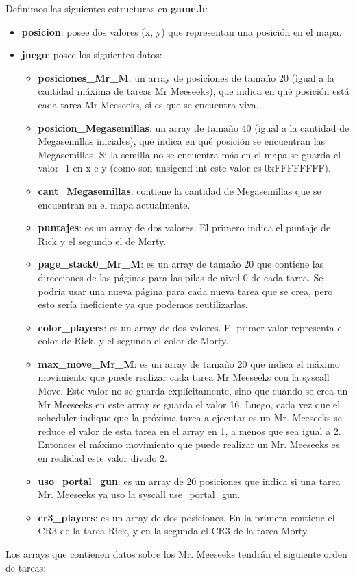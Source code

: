 \documentclass[a4paper]{article}
\begin{document}
\justify
Definimos las siguientes estructuras en \textbf{game.h}:
\begin{itemize}
	\item \textbf{posicion}: posee dos valores (x, y) que representan una posición en el mapa.
	\item \textbf{juego}: posee los siguientes datos:
	\begin{itemize}
		\item \textbf{posiciones_Mr_M}: un array de posiciones de tamaño 20 (igual a la cantidad máxima de tareas Mr Meeseeks), que indica en qué posición está cada tarea Mr Meeseeks, si es que se encuentra viva.
		\item \textbf{posicion_Megasemillas}: un array de tamaño 40 (igual a la cantidad de Megasemillas iniciales), que indica en qué posición se encuentran las Megasemillas. Si la semilla no se encuentra más en el mapa se guarda el valor -1 en x e y (como son unsigend int este valor es 0xFFFFFFFF).
		\item \textbf{cant_Megasemillas}: contiene la cantidad de Megasemillas que se encuentran en el mapa actualmente.
		\item \textbf{puntajes}: es un array de dos valores. El primero indica el puntaje de Rick y el segundo el de Morty.
		\item \textbf{page_stack0_Mr_M}: es un array de tamaño 20 que contiene las direcciones de las páginas para las pilas de nivel 0 de cada tarea. Se podría usar una nueva página para cada nueva tarea que se crea, pero esto sería ineficiente ya que podemos reutilizarlas.
		\item \textbf{color_players}: es un array de dos valores. El primer valor representa el color de Rick, y el segundo el color de Morty.
		\item \textbf{max_move_Mr_M}: es un array de tamaño 20 que  indica el máximo movimiento que puede realizar cada tarea Mr Meeseeks con la syscall Move. Este valor no se guarda explícitamente, sino que cuando se crea un Mr Meeseeks en este array se guarda el valor 16. Luego, cada vez que el scheduler indique que la próxima tarea a ejecutar es un Mr. Meeseeks se reduce el valor de esta tarea en el array en 1, a menos que sea igual a 2. Entonces el máximo movimiento que puede realizar un Mr. Meeseeks es en realidad este valor divido $2$.
		\item \textbf{uso_portal_gun}: es un array de 20 posiciones que indica si una tarea Mr. Meeseeks ya uso la syscall use_portal_gun.
		\item \textbf{cr3_players}: es un array de dos posiciones. En la primera contiene el CR3 de la tarea Rick, y en la segunda el CR3 de la tarea Morty.
	\end{itemize}
\end{itemize}
Los arrays que contienen datos sobre los Mr. Meeseeks tendrán el siguiente orden de tareas:
\end{document}
